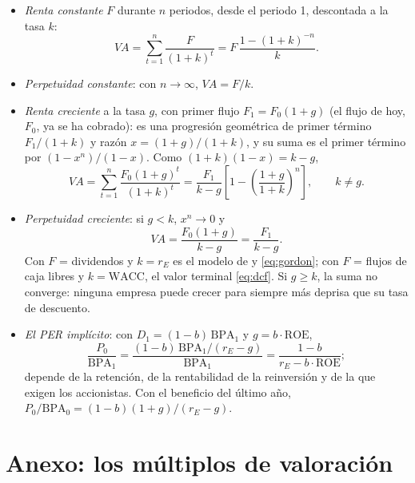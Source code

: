 \documentclass[11pt]{article}
\begin{document}
\begin{itemize}
\item \emph{Renta constante} $F$ durante $n$ periodos, desde el periodo 1, descontada a la tasa $k$:
  \[
  VA=\sum_{t=1}^{n}\frac{F}{(1+k)^t}=F\,\frac{1-(1+k)^{-n}}{k}.
  \]
\item \emph{Perpetuidad constante}: con $n\to\infty$, $VA=F/k$.
\item \emph{Renta creciente} a la tasa $g$, con primer flujo $F_1=F_0(1+g)$ (el flujo de hoy, $F_0$, ya se ha cobrado): es una progresión geométrica de primer término $F_1/(1+k)$ y razón $x=(1+g)/(1+k)$, y su suma es el primer término por $(1-x^n)/(1-x)$. Como $(1+k)(1-x)=k-g$,
  \[
  VA=\sum_{t=1}^{n}\frac{F_0(1+g)^{t}}{(1+k)^t}=\frac{F_1}{k-g}\left[1-\left(\frac{1+g}{1+k}\right)^{n}\right],\qquad k\neq g.
  \]
\item \emph{Perpetuidad creciente}: si $g<k$, $x^n\to0$ y
  \[
  VA=\frac{F_0(1+g)}{k-g}=\frac{F_1}{k-g}.
  \]
  Con $F$ = dividendos y $k=r_E$ es el modelo de  y  \eqref{eq:gordon}; con $F$ = flujos de caja libres y $k=\mathrm{WACC}$, el valor terminal \eqref{eq:dcf}. Si $g\geq k$, la suma no converge: ninguna empresa puede crecer para siempre más deprisa que su tasa de descuento.\findemo
\item \emph{El PER implícito}: con $D_1=(1-b)\,\mathrm{BPA}_1$ y $g=b\cdot\mathrm{ROE}$,
  \[
  \frac{P_0}{\mathrm{BPA}_1}=\frac{(1-b)\,\mathrm{BPA}_1/(r_E-g)}{\mathrm{BPA}_1}=\frac{1-b}{r_E-b\cdot\mathrm{ROE}};
  \]
  depende de la retención, de la rentabilidad de la reinversión y de la que exigen los accionistas. Con el beneficio del último año, $P_0/\mathrm{BPA}_0=(1-b)(1+g)/(r_E-g)$.\findemo
\end{itemize}

\section{Anexo: los múltiplos de valoración}\label{anexo:multiplos}
\end{document}
